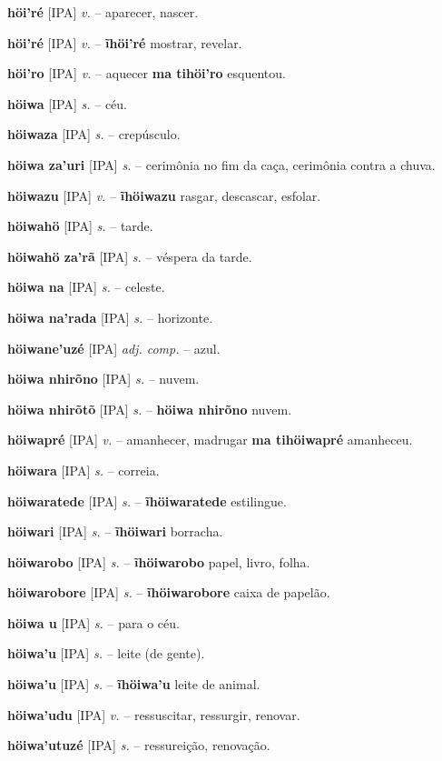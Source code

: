 \textbf{höi'ré} [IPA] \textit{v.} -- aparecer, nascer.

\textbf{höi'ré} [IPA] \textit{v.} -- \textbf{ĩhöi'ré} mostrar, revelar.

\textbf{höi'ro} [IPA] \textit{v.} -- aquecer  \textbf{ma tihöi'ro} esquentou.

\textbf{höiwa} [IPA] \textit{s.} -- céu.

\textbf{höiwaza} [IPA] \textit{s.} -- crepúsculo.

\textbf{höiwa za'uri} [IPA] \textit{s.} -- cerimônia no fim da caça, cerimônia contra a chuva.

\textbf{höiwazu} [IPA] \textit{v.} -- \textbf{ĩhöiwazu} rasgar, descascar, esfolar.

\textbf{höiwahö} [IPA] \textit{s.} -- tarde.

\textbf{höiwahö za'rã} [IPA] \textit{s.} -- véspera da tarde.

\textbf{höiwa na} [IPA] \textit{s.} -- celeste.

\textbf{höiwa na'rada} [IPA] \textit{s.} -- horizonte.

\textbf{höiwane'uzé} [IPA] \textit{adj. comp.} -- azul.

\textbf{höiwa nhirõno} [IPA] \textit{s.} -- nuvem.

\textbf{höiwa nhirõtõ} [IPA] \textit{s.} -- \textbf{höiwa nhirõno} nuvem.

\textbf{höiwapré} [IPA] \textit{v.} -- amanhecer, madrugar  \textbf{ma tihöiwapré} amanheceu.

\textbf{höiwara} [IPA] \textit{s.} -- correia.

\textbf{höiwaratede} [IPA] \textit{s.} -- \textbf{ĩhöiwaratede} estilingue.

\textbf{höiwari} [IPA] \textit{s.} -- \textbf{ĩhöiwari} borracha.

\textbf{höiwarobo} [IPA] \textit{s.} -- \textbf{ĩhöiwarobo} papel, livro, folha.

\textbf{höiwarobore} [IPA] \textit{s.} -- \textbf{ĩhöiwarobore} caixa de papelão.

\textbf{höiwa u} [IPA] \textit{s.} -- para o céu.

\textbf{höiwa'u} [IPA] \textit{s.} -- leite (de gente).

\textbf{höiwa'u} [IPA] \textit{s.} -- \textbf{ĩhöiwa'u} leite de animal.

\textbf{höiwa'udu} [IPA] \textit{v.} -- ressuscitar, ressurgir, renovar.

\textbf{höiwa'utuzé} [IPA] \textit{s.} -- ressureição, renovação.

